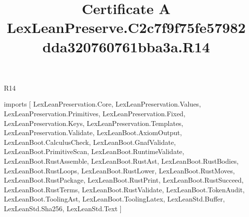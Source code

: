 \begin{lexlean}{R14}
\title{Certificate A LexLeanPreserve.C2c7f9f75fe57982dda320760761bba3a.R14}
\begin{coremodule}
imports [
  LexLeanPreservation.Core,
  LexLeanPreservation.Values,
  LexLeanPreservation.Primitives,
  LexLeanPreservation.Fixed,
  LexLeanPreservation.Keys,
  LexLeanPreservation.Templates,
  LexLeanPreservation.Validate,
  LexLeanBoot.AxiomOutput,
  LexLeanBoot.CalculusCheck,
  LexLeanBoot.GnafValidate,
  LexLeanBoot.PrimitiveScan,
  LexLeanBoot.RuntimeValidate,
  LexLeanBoot.RustAssemble,
  LexLeanBoot.RustAst,
  LexLeanBoot.RustBodies,
  LexLeanBoot.RustLoops,
  LexLeanBoot.RustLower,
  LexLeanBoot.RustMoves,
  LexLeanBoot.RustPackage,
  LexLeanBoot.RustPrint,
  LexLeanBoot.RustSucceed,
  LexLeanBoot.RustTerms,
  LexLeanBoot.RustValidate,
  LexLeanBoot.TokenAudit,
  LexLeanBoot.ToolingAst,
  LexLeanBoot.ToolingLatex,
  LexLeanStd.Buffer,
  LexLeanStd.Sha256,
  LexLeanStd.Text
]


\end{coremodule}
\end{lexlean}
